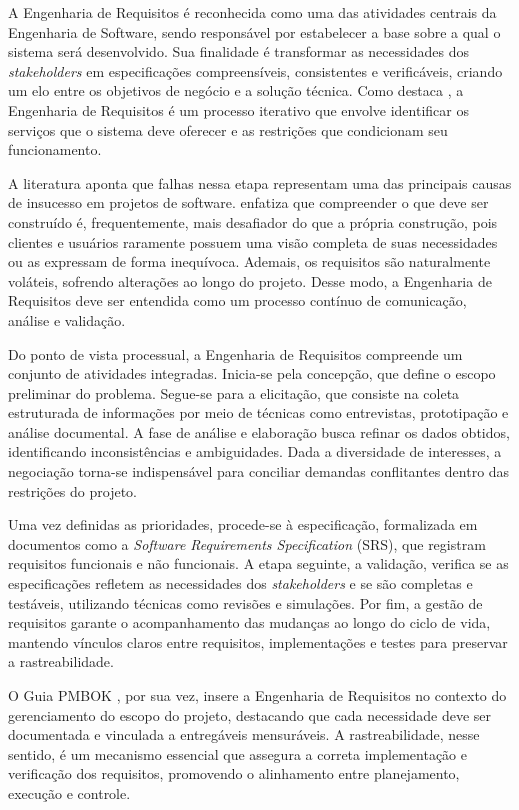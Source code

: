 A Engenharia de Requisitos é reconhecida como uma das atividades centrais da Engenharia de Software, sendo responsável por estabelecer a base sobre a qual o sistema será desenvolvido. Sua finalidade é transformar as necessidades dos \textit{stakeholders} em especificações compreensíveis, consistentes e verificáveis, criando um elo entre os objetivos de negócio e a solução técnica. Como destaca , a Engenharia de Requisitos é um processo iterativo que envolve identificar os serviços que o sistema deve oferecer e as restrições que condicionam seu funcionamento.

A literatura aponta que falhas nessa etapa representam uma das principais causas de insucesso em projetos de software.  enfatiza que compreender o que deve ser construído é, frequentemente, mais desafiador do que a própria construção, pois clientes e usuários raramente possuem uma visão completa de suas necessidades ou as expressam de forma inequívoca. Ademais, os requisitos são naturalmente voláteis, sofrendo alterações ao longo do projeto. Desse modo, a Engenharia de Requisitos deve ser entendida como um processo contínuo de comunicação, análise e validação.

Do ponto de vista processual, a Engenharia de Requisitos compreende um conjunto de atividades integradas. Inicia-se pela concepção, que define o escopo preliminar do problema. Segue-se para a elicitação, que consiste na coleta estruturada de informações por meio de técnicas como entrevistas, prototipação e análise documental. A fase de análise e elaboração busca refinar os dados obtidos, identificando inconsistências e ambiguidades. Dada a diversidade de interesses, a negociação torna-se indispensável para conciliar demandas conflitantes dentro das restrições do projeto.

Uma vez definidas as prioridades, procede-se à especificação, formalizada em documentos como a \textit{Software Requirements Specification} (SRS), que registram requisitos funcionais e não funcionais. A etapa seguinte, a validação, verifica se as especificações refletem as necessidades dos \textit{stakeholders} e se são completas e testáveis, utilizando técnicas como revisões e simulações. Por fim, a gestão de requisitos garante o acompanhamento das mudanças ao longo do ciclo de vida, mantendo vínculos claros entre requisitos, implementações e testes para preservar a rastreabilidade.

O Guia PMBOK \cite{pmi2008}, por sua vez, insere a Engenharia de Requisitos no contexto do gerenciamento do escopo do projeto, destacando que cada necessidade deve ser documentada e vinculada a entregáveis mensuráveis. A rastreabilidade, nesse sentido, é um mecanismo essencial que assegura a correta implementação e verificação dos requisitos, promovendo o alinhamento entre planejamento, execução e controle.

